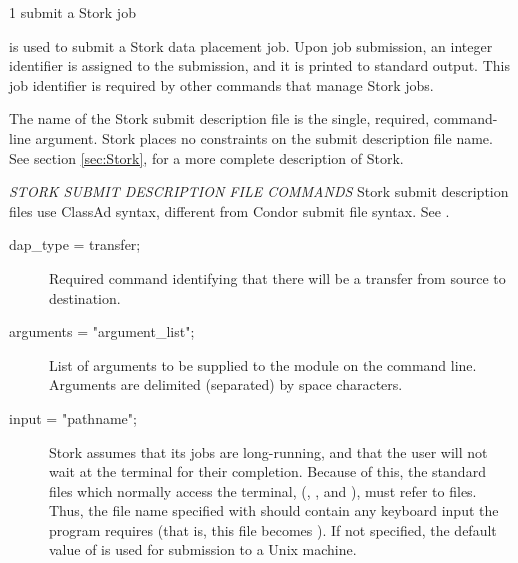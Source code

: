 \begin{ManPage}{\label{man-stork-submit}}{1}
{submit a Stork job}

\Synopsis {}
\ToolArgsBase

\Storkname
{}


\Description 

 is used to submit a Stork data placement job.
Upon job submission, an integer identifier is assigned to the
submission,
	and it is printed to standard output.
This job identifier is required by other commands
that manage Stork jobs.

The name of the Stork submit description file is the single,
required, command-line argument.
Stork places no constraints on the submit
description file name.
See section \ref{sec:Stork}, for a more 
complete description of Stork.

\emph{STORK SUBMIT DESCRIPTION FILE COMMANDS}
Stork submit description files use ClassAd syntax, different from Condor submit
file syntax.  See .

\begin{description}

\item[dap\_type = transfer;]
Required command identifying that there will be
a transfer from source to destination.


\item[arguments = "\lt{}argument\_list\gt{}";]
List of arguments to be supplied
to the module on the command line.
Arguments are delimited (separated) by space characters.


\item[input = "\lt{}pathname\gt{}";]
Stork assumes that its jobs are
long-running, and that the user will not wait at the terminal for their
completion. Because of this, the standard files which normally access
the terminal, (, , and ),
must refer to files. Thus,
the file name specified with  should contain any keyboard
input the program requires (that is, this file becomes ).
If not specified, the default value
of  is used for submission to a Unix machine.


\end{description}
\end{ManPage}

